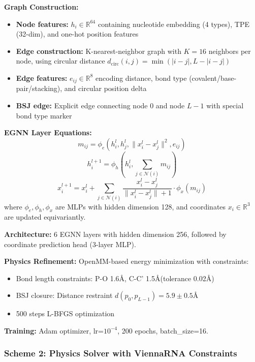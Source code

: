 \documentclass[12pt]{article}
\begin{document}
\textbf{Graph Construction:}
\begin{itemize}
\item \textbf{Node features:} $h_i \in \mathbb{R}^{64}$ containing nucleotide embedding (4 types), TPE (32-dim), and one-hot position features
\item \textbf{Edge construction:} K-nearest-neighbor graph with $K=16$ neighbors per node, using circular distance $d_{\text{circ}}(i,j) = \min(|i-j|, L-|i-j|)$
\item \textbf{Edge features:} $e_{ij} \in \mathbb{R}^{8}$ encoding distance, bond type (covalent/base-pair/stacking), and circular position delta
\item \textbf{BSJ edge:} Explicit edge connecting node 0 and node $L-1$ with special bond type marker
\end{itemize}

\textbf{EGNN Layer Equations:}
\begin{equation}
m_{ij} = \phi_e(h_i^l, h_j^l, \|x_i^l - x_j^l\|^2, e_{ij})
\end{equation}
\begin{equation}
h_i^{l+1} = \phi_h(h_i^l, \sum_{j \in \mathcal{N}(i)} m_{ij})
\end{equation}
\begin{equation}
x_i^{l+1} = x_i^l + \sum_{j \in \mathcal{N}(i)} \frac{x_i^l - x_j^l}{\|x_i^l - x_j^l\| + 1} \cdot \phi_x(m_{ij})
\end{equation}
where $\phi_e, \phi_h, \phi_x$ are MLPs with hidden dimension 128, and coordinates $x_i \in \mathbb{R}^3$ are updated equivariantly.

\textbf{Architecture:} 6 EGNN layers with hidden dimension 256, followed by coordinate prediction head (3-layer MLP).

\textbf{Physics Refinement:} OpenMM-based energy minimization with constraints:
\begin{itemize}
\item Bond length constraints: P-O 1.6\AA, C-C' 1.5\AA (tolerance 0.02\AA)
\item BSJ closure: Distance restraint $d(p_0, p_{L-1}) = 5.9 \pm 0.5$\AA
\item 500 steps L-BFGS optimization
\end{itemize}

\textbf{Training:} Adam optimizer, lr=$10^{-4}$, 200 epochs, batch\_size=16.

\subsubsection{Scheme 2: Physics Solver with ViennaRNA Constraints}
\end{document}
